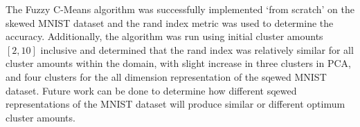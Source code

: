The Fuzzy C-Means algorithm was successfully implemented `from scratch' on the skewed MNIST dataset and the rand index metric was used to determine the accuracy. Additionally, the algorithm was run using initial cluster amounts $[2,10]$ inclusive and determined that the rand index was relatively similar for all cluster amounts within the domain, with slight increase in three clusters in PCA, and four clusters for the all dimension representation of the sqewed MNIST dataset. Future work can be done to determine how different sqewed representations of the MNIST dataset will produce similar or different optimum cluster amounts.
